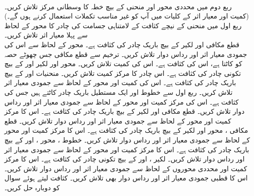 \\
ربع دوم میں محددی محور اور منحنی  کے بیچ خطہ کا وسطانی مرکز تلاش کریں۔ (کمیت اور معیار اثر کے کلیات میں آپ کو غیر مناسب تکملات استعمال کرنے ہوں گے۔)
\\
ربع اول میں منحنی  کے نیچے  کثافت  کے لامتناہی جسامت کی چادر   کا محور  کے لحاظ سے پہلا معیار اثر تلاش کریں۔
\\
قطع مکافی  اور لکیر  کے بیچ باریک چادر کی کثافت  ہے۔ محور  کے لحاظ سے اس کی جمودی معیار اثر اور رداس دوار تلاش کریں۔ 
ترخیم  سے قطع مکافی   جس چھوٹے حصہ کو کاٹتا ہے، اس کی کثافت  ہے۔ اس کی کمیت تلاش کریں۔
محور  اور  لکیر  اور  کے بیچ تکونی چادر کی کثافت  ہے۔ اس چادر کا مرکز کمیت تلاش کریں۔
منحنیات   اور  کے بیچ باریک چادر کی کثافت  ہے۔ اس کی کمیت اور محور  کے لحاظ سے جمودی معیار اثر تلاش کریں۔
ربع اول سے خطوط  اور  ایک مستطیل  باریک چادر کاٹتے ہیں جس کی کثافت  ہے۔ اس کی مرکز کمیت اور محور  کے لحاظ سے جمودی معیار اثر  اور رداس دوار تلاش کریں۔
قطع مکافی  اور لکیر  کے بیچ باریک چادر کی کثافت  ہے۔ اس کا مرکز کمیت اور محور  کے لحاظ سے جمودی معیار اثر اور رداس  دوار تلاش کریں۔
قطع مکافی ، محور  اور  لکیر  کے بیچ باریک چادر کی کثافت  ہے۔ اس کا مرکز کمیت اور محور  کے لحاظ سے جمودی معیار اثر اور رداس  دوار تلاش کریں۔
خطوط  ، محور ،  اور   کے بیچ باریک چادر کی کثافت  ہے۔ اس کا مرکز کمیت اور محور  کے لحاظ سے جمودی معیار اثر اور رداس  دوار تلاش کریں۔
لکیر ،  اور  کے بیچ تکونی چادر کی کثافت  ہے۔ اس کا مرکز کمیت  اور محددی محوروں کے لحاظ سے جمودی معیار اثر اور رداس دوار تلاش کریں۔ اس کا قطبی جمودی معیار اثر اور  رداس دوار بھی تلاش کریں۔
کثافت  لیتے ہوئے سوال  کو دوبارہ حل کریں۔

